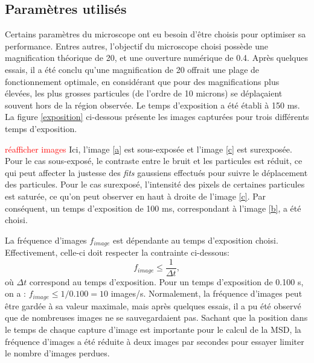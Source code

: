 \documentclass[11pt,letterpaper]{article}
\begin{document}
\subsection{Paramètres utilisés \label{para}}
Certains paramètres du microscope ont eu besoin d'être choisis pour optimiser sa performance. Entres autres,
l'objectif du microscope choisi possède une magnification théorique de 20, et une ouverture numérique de 0.4. Après quelques essais, 
il a été conclu qu'une magnification de 20 offrait une plage de fonctionnement optimale, en considérant 
que pour des magnifications plus élevées, les plus grosses particules (de l'ordre de 10 microns) se déplaçaient souvent hors de la région observée. 
Le temps d'exposition a été établi à 150 ms. La figure \ref{exposition} ci-dessous présente les images
capturées pour trois différents temps d'exposition.

\textcolor{red}{réafficher images}
Ici, l'image \ref{a} est sous-exposée et l'image \ref{c} est surexposée. Pour le cas sous-exposé, le contraste entre
le bruit et les particules est réduit, ce qui peut affecter la justesse des \textit{fits} gaussiens effectués pour suivre
le déplacement des particules. Pour le cas surexposé, l'intensité des pixels de certaines particules est saturée, ce qu'on peut
observer en haut à droite de l'image \ref{c}. Par conséquent, un temps d'exposition de 100 ms, correspondant à l'image \ref{b}, a été choisi.

La fréquence d'images $f_{image}$ est dépendante au temps d'exposition choisi. Effectivement, celle-ci doit respecter la contrainte
ci-dessous:
\begin{equation*}
  f_{image}\leq \frac{1}{\Delta t},
\end{equation*}
où $\Delta t$ correspond au temps d'exposition. Pour un temps d'exposition de 0.100 s, on a : $f_{image}\leq 1/0.100 = 10$ images/s. 
Normalement, la fréquence d'images peut être gardée à sa valeur maximale, mais après quelques essais, il a pu été observé que de nombreuses
images ne se sauvegardaient pas. Sachant que la position dans le temps de chaque capture d'image est importante pour le calcul de la MSD, la fréquence 
d'images a été réduite à deux images par secondes pour essayer limiter le nombre d'images perdues. 
\end{document}
